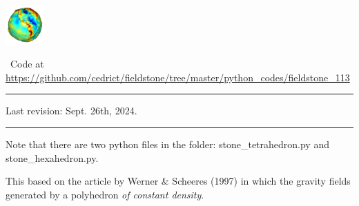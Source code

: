
\includegraphics[height=1.5cm]{images/pictograms/gravity}

%

\begin{center}
\inpython~Code at \url{https://github.com/cedrict/fieldstone/tree/master/python_codes/fieldstone_113}
\end{center}

\par\noindent\rule{\textwidth}{0.4pt}


Last revision: Sept. 26th, 2024.

\par\noindent\rule{\textwidth}{0.4pt}

Note that there are two python files in the folder: {\python stone\_tetrahedron.py}
and {\python stone\_hexahedron.py}.

This \stone based on the article by Werner \& Scheeres (1997) \cite{wesc97} in which 
the gravity fields generated by a polyhedron {\it of constant density}.

